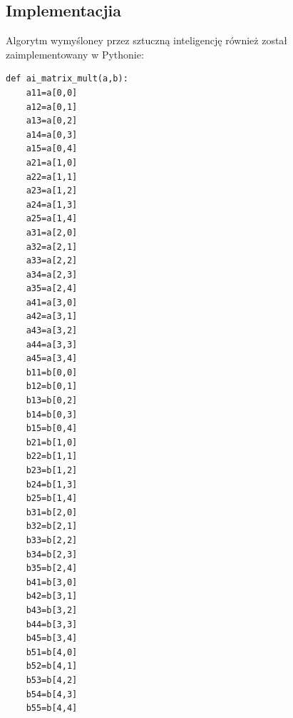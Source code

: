 \documentclass{article}
\begin{document}
\subsection{Implementacjia}

Algorytm wymyśloney przez sztuczną inteligencję również został zaimplementowany w Pythonie:

\begin{verbatim}
def ai_matrix_mult(a,b):
    a11=a[0,0]
    a12=a[0,1]
    a13=a[0,2]
    a14=a[0,3]
    a15=a[0,4]
    a21=a[1,0]
    a22=a[1,1]
    a23=a[1,2]
    a24=a[1,3]
    a25=a[1,4]
    a31=a[2,0]
    a32=a[2,1]
    a33=a[2,2]
    a34=a[2,3]
    a35=a[2,4]
    a41=a[3,0]
    a42=a[3,1]
    a43=a[3,2]
    a44=a[3,3]
    a45=a[3,4]
    b11=b[0,0]
    b12=b[0,1]
    b13=b[0,2]
    b14=b[0,3]
    b15=b[0,4]
    b21=b[1,0]
    b22=b[1,1]
    b23=b[1,2]
    b24=b[1,3]
    b25=b[1,4]
    b31=b[2,0]
    b32=b[2,1]
    b33=b[2,2]
    b34=b[2,3]
    b35=b[2,4]
    b41=b[3,0]
    b42=b[3,1]
    b43=b[3,2]
    b44=b[3,3]
    b45=b[3,4]
    b51=b[4,0]
    b52=b[4,1]
    b53=b[4,2]
    b54=b[4,3]
    b55=b[4,4]


\end{verbatim}
\end{document}
